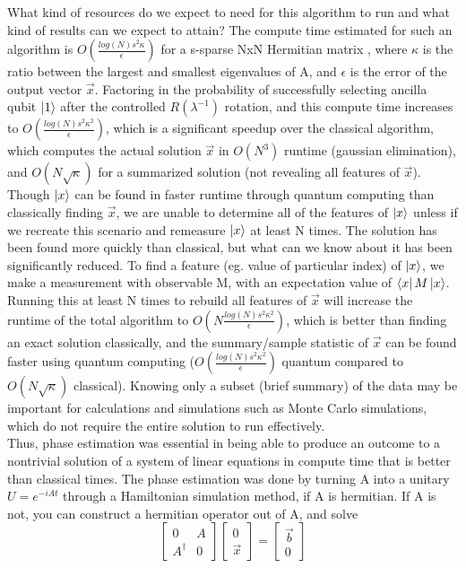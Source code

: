 \documentclass[11pt]{journal}
\begin{document}
What kind of resources do we expect to need for this algorithm to run and what kind of results can we expect to attain? The compute time estimated for such an algorithm is $O(\frac{log(N)s^2\kappa}{\epsilon})$ for a s-sparse NxN Hermitian matrix \cite{sle1}, where $\kappa$ is the ratio between the largest and smallest eigenvalues of A, and $\epsilon$ is the error of the output vector $\vec{x}$. Factoring in the probability of successfully selecting ancilla qubit $\ket{1}$ after the controlled $R(\lambda^{-1})$ rotation, and this compute time increases to $O(\frac{log(N)s^2\kappa^2}{\epsilon})$, which is a significant speedup over the classical algorithm, which computes the actual solution $\vec{x}$ in $O(N^3)$ runtime (gaussian elimination), and $O(N\sqrt{\kappa})$ for a summarized solution (not revealing all features of $\vec{x}$). Though $\ket{x}$ can be found in faster runtime through quantum computing than  classically finding $\vec{x}$, we are unable to determine all of the features of $\ket{x}$ unless if we recreate this scenario and remeasure $\ket{x}$ at least N times. The solution has been found more quickly than classical, but what can we know about it has been significantly reduced. To find a feature (eg. value of particular index) of $\ket{x}$, we make a measurement with observable M, with an expectation value of $\bra{x}M\ket{x}$. Running this at least N times to rebuild all features of $\vec{x}$ will increase the runtime of the total algorithm to $O(N\frac{log(N)s^2\kappa^2}{\epsilon})$, which is better than finding an exact solution classically, and the summary/sample statistic of $\vec{x}$ can be found faster using quantum computing ($O(\frac{log(N)s^2\kappa^2}{\epsilon})$ quantum compared to $O(N\sqrt{\kappa})$ classical). Knowing only a subset (brief summary) of the data may be important for calculations and simulations such as Monte Carlo simulations, which do not require the entire solution to run effectively. \\\indent Thus, phase estimation was essential in being able to produce an outcome to a nontrivial solution of a system of linear equations in compute time that is better than classical times. The phase estimation was done by turning A into a unitary $U = e^{-iAt}$ through a Hamiltonian simulation method, if A is hermitian. If A is not, you can construct a hermitian operator out of A, and solve
\[\begin{bmatrix} 0 & A \\ A^\dagger & 0\end{bmatrix} \begin{bmatrix}0\\\vec{x} \end{bmatrix} = \begin{bmatrix}\vec{b} \\ 0 \end{bmatrix}\]
\end{document}
